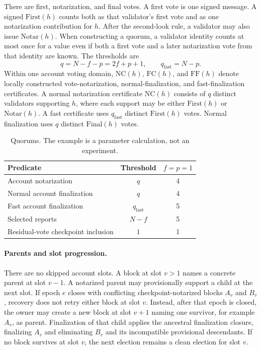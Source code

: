 \documentclass[10pt,twocolumn]{article}
\newcommand{\NC}{\mathrm{NC}}
\newcommand{\FC}{\mathrm{FC}}
\newcommand{\FF}{\mathrm{FF}}
\newcommand{\First}{\mathrm{First}}
\newcommand{\Notar}{\mathrm{Notar}}
\newcommand{\Final}{\mathrm{Final}}
\begin{document}
There are first, notarization, and final votes. A first vote is one signed message. A signed $\First(h)$ counts both as that validator's first vote and as one notarization contribution for $h$. After the second-look rule, a validator may also issue $\Notar(h)$. When constructing a quorum, a validator identity counts at most once for a value even if both a first vote and a later notarization vote from that identity are known. The thresholds are
\begin{equation}
q=N-f-p=2f+p+1,\qquad q_{\mathrm{fast}}=N-p.
\end{equation}
Within one account voting domain, $\NC(h)$, $\FC(h)$, and $\FF(h)$ denote locally constructed vote-notarization, normal-finalization, and fast-finalization certificates. A normal notarization certificate $\NC(h)$ consists of $q$ distinct validators supporting $h$, where each support may be either $\First(h)$ or $\Notar(h)$. A fast certificate uses $q_{\mathrm{fast}}$ distinct $\First(h)$ votes. Normal finalization uses $q$ distinct $\Final(h)$ votes.

\begin{table}[t]
\centering
\caption{Quorums. The example is a parameter calculation, not an experiment.}
\begin{tabular}{lcc}
\toprule
Predicate & Threshold & $f=p=1$\\
\midrule
Account notarization & $q$ & 4\\
Normal account finalization & $q$ & 4\\
Fast account finalization & $q_{\mathrm{fast}}$ & 5\\
Selected reports & $N-f$ & 5\\
Residual-vote checkpoint inclusion & $1$ & 1\\
\bottomrule
\end{tabular}
\end{table}

\paragraph{Parents and slot progression.} There are no skipped account slots. A block at slot $v>1$ names a concrete parent at slot $v-1$. A notarized parent may provisionally support a child at the next slot. If epoch $e$ closes with conflicting checkpoint-notarized blocks $A_v$ and $B_v$, recovery does not retry either block at slot $v$. Instead, after that epoch is closed, the owner may create a new block at slot $v+1$ naming one survivor, for example $A_v$, as parent. Finalization of that child applies the ancestral finalization closure, finalizing $A_v$ and eliminating $B_v$ and its incompatible provisional descendants. If no block survives at slot $v$, the next election remains a clean election for slot $v$.
\end{document}
